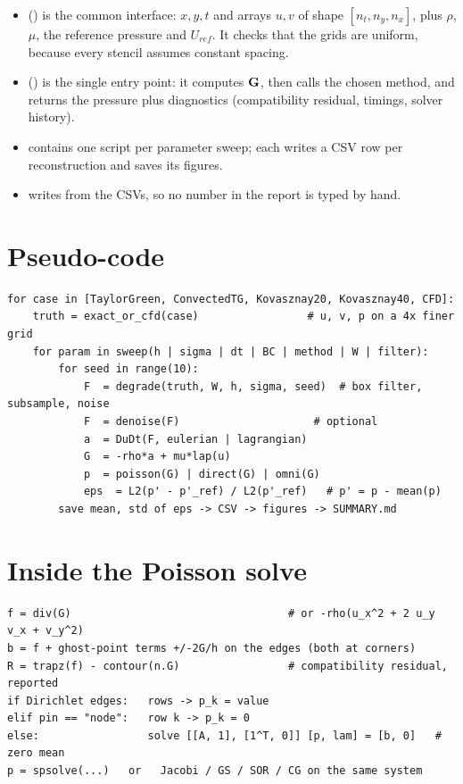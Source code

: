 \begin{itemize}
\item \textbf{} () is the common interface: $x,y,t$ and arrays $u,v$ of shape $[n_t,n_y,n_x]$, plus $\rho$, $\mu$, the reference pressure and $U_{ref}$. It checks that the grids are uniform, because every stencil assumes constant spacing.
\item \textbf{} () is the single entry point: it computes $\mathbf{G}$, then calls the chosen method, and returns the pressure plus diagnostics (compatibility residual, timings, solver history).
\item \textbf{} contains one script per parameter sweep; each writes a CSV row per reconstruction and saves its figures.
\item \textbf{} writes  from the CSVs, so no number in the report is typed by hand.
\end{itemize}

\section{Pseudo-code}
\begin{lstlisting}
for case in [TaylorGreen, ConvectedTG, Kovasznay20, Kovasznay40, CFD]:
    truth = exact_or_cfd(case)                 # u, v, p on a 4x finer grid
    for param in sweep(h | sigma | dt | BC | method | W | filter):
        for seed in range(10):
            F  = degrade(truth, W, h, sigma, seed)  # box filter, subsample, noise
            F  = denoise(F)                     # optional
            a  = DuDt(F, eulerian | lagrangian)
            G  = -rho*a + mu*lap(u)
            p  = poisson(G) | direct(G) | omni(G)
            eps  = L2(p' - p'_ref) / L2(p'_ref)   # p' = p - mean(p)
        save mean, std of eps -> CSV -> figures -> SUMMARY.md
\end{lstlisting}

\section{Inside the Poisson solve}
\begin{lstlisting}
f = div(G)                                  # or -rho(u_x^2 + 2 u_y v_x + v_y^2)
b = f + ghost-point terms +/-2G/h on the edges (both at corners)
R = trapz(f) - contour(n.G)                 # compatibility residual, reported
if Dirichlet edges:   rows -> p_k = value
elif pin == "node":   row k -> p_k = 0
else:                 solve [[A, 1], [1^T, 0]] [p, lam] = [b, 0]   # zero mean
p = spsolve(...)   or   Jacobi / GS / SOR / CG on the same system
\end{lstlisting}

